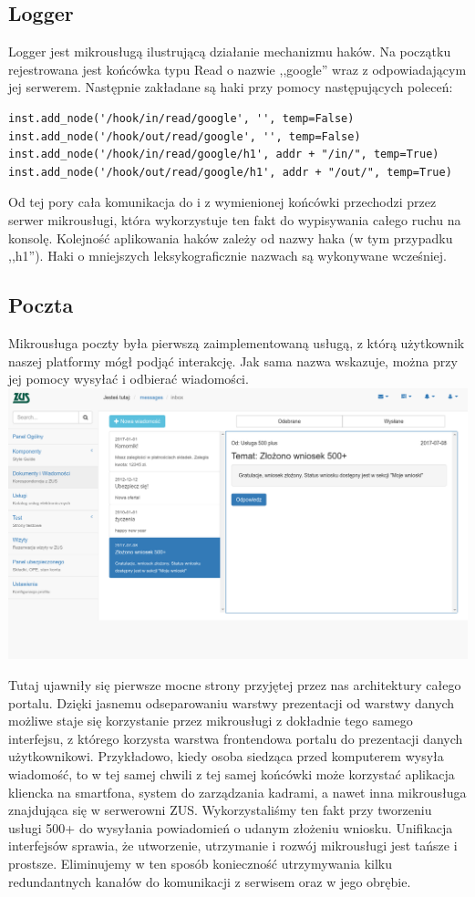 \documentclass[licencjacka]{pracamgr}
\begin{document}
\subsection{Logger}

Logger jest mikrousługą ilustrującą działanie mechanizmu haków. Na początku
rejestrowana jest końcówka typu Read o nazwie ,,google'' wraz z odpowiadającym
jej serwerem. Następnie zakładane są haki przy pomocy następujących poleceń:
\begin{verbatim}
inst.add_node('/hook/in/read/google', '', temp=False)
inst.add_node('/hook/out/read/google', '', temp=False)
inst.add_node('/hook/in/read/google/h1', addr + "/in/", temp=True)
inst.add_node('/hook/out/read/google/h1', addr + "/out/", temp=True)
\end{verbatim}
Od tej pory cała komunikacja do i z wymienionej końcówki przechodzi przez serwer
mikrousługi, która wykorzystuje ten fakt do wypisywania całego ruchu na konsolę.
Kolejność aplikowania haków zależy od nazwy haka (w tym przypadku ,,h1'').
Haki o mniejszych leksykograficznie nazwach są wykonywane wcześniej.

\subsection{Poczta}
Mikrousługa poczty była pierwszą zaimplementowaną usługą, z którą użytkownik
naszej platformy mógł podjąć interakcję. Jak sama nazwa wskazuje, można przy jej
pomocy wysyłać i odbierać wiadomości.\\
\includegraphics[width=\textwidth]{obrazki/poczta.png}

Tutaj ujawniły się pierwsze mocne strony przyjętej przez nas architektury całego
portalu. Dzięki jasnemu odseparowaniu warstwy prezentacji od warstwy danych
możliwe staje się korzystanie przez mikrousługi z dokładnie tego samego interfejsu,
z którego korzysta warstwa frontendowa portalu do prezentacji danych użytkownikowi.
Przykładowo, kiedy osoba siedząca przed komputerem wysyła wiadomość, to w tej samej
chwili z tej samej końcówki może korzystać aplikacja kliencka na smartfona, system
do zarządzania kadrami, a nawet inna mikrousługa znajdująca się w serwerowni ZUS.
Wykorzystaliśmy ten fakt przy tworzeniu usługi 500+ do wysyłania powiadomień o
udanym złożeniu wniosku.
Unifikacja interfejsów sprawia, że utworzenie, utrzymanie i rozwój mikrousługi jest
tańsze i prostsze. Eliminujemy w ten sposób konieczność utrzymywania kilku redundantnych
kanałów do komunikacji z serwisem oraz w jego obrębie.
\end{document}
